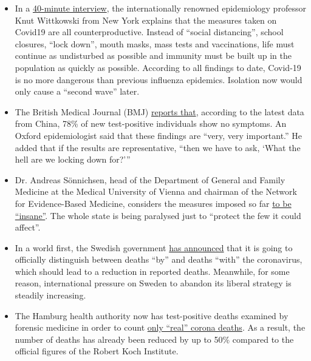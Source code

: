 \begin{itemize}
\tightlist
\item
  In a \href{https://www.youtube.com/watch?v=lGC5sGdz4kg}{40-minute
  interview}, the internationally renowned epidemiology professor Knut
  Wittkowski from New York explains that the measures taken on Covid19
  are all counterproductive. Instead of ``social distancing'', school
  closures, ``lock down'', mouth masks, mass tests and vaccinations,
  life must continue as undisturbed as possible and immunity must be
  built up in the population as quickly as possible. According to all
  findings to date, Covid-19 is no more dangerous than previous
  influenza epidemics. Isolation now would only cause a ``second wave''
  later.
\item
  The British Medical Journal (BMJ)
  \href{https://www.bmj.com/content/369/bmj.m1375}{reports that},
  according to the latest data from China, 78\% of new test-positive
  individuals show no symptoms. An Oxford epidemiologist said that these
  findings are ``very, very important.'' He added that if the results
  are representative, ``then we have to ask, `What the hell are we
  locking down for?'''
\item
  Dr. Andreas Sönnichsen, head of the Department of General and Family
  Medicine at the Medical University of Vienna and chairman of the
  Network for Evidence-Based Medicine, considers the measures imposed so
  far
  \href{https://www.diepresse.com/5794224/was-machen-wir-da-auf-den-intensivstationen-eigentlich}{to
  be ``insane''}. The whole state is being paralysed just to ``protect
  the few it could affect''.
\item
  In a world first, the Swedish government
  \href{https://www.telegraph.co.uk/news/2020/04/03/coronavirus-swedish-experiment-could-prove-britain-wrong/}{has
  announced} that it is going to officially distinguish between deaths
  ``by'' and deaths ``with'' the coronavirus, which should lead to a
  reduction in reported deaths. Meanwhile, for some reason,
  international pressure on Sweden to abandon its liberal strategy is
  steadily increasing.
\item
  The Hamburg health authority now has test-positive deaths examined by
  forensic medicine in order to count
  \href{https://www.t-online.de/nachrichten/deutschland/id_87636856/coronavirus-hamburg-will-nur-echte-covid-19-tote-zaehlen.html}{only
  ``real'' corona deaths}. As a result, the number of deaths has already
  been reduced by up to 50\% compared to the official figures of the
  Robert Koch Institute.

\end{itemize}
